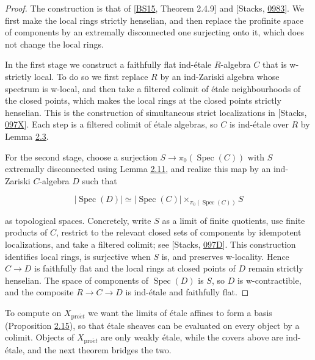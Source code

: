 \documentclass[11pt]{article}
\begin{document}
\begin{proof}[{Proof}]\label{bp38}%
The construction is that of [\hyperref[bp191]{BS15}, Theorem 2.4.9] and [Stacks, \href{https://stacks.math.columbia.edu/tag/0983}{0983}]. We first make the local rings strictly henselian, and then replace the profinite space of components by an extremally disconnected one surjecting onto it, which does not change the local rings.

In the first stage we construct a faithfully flat ind-étale \(R\)-algebra \(C\) that is w-strictly local. To do so we first replace \(R\) by an ind-Zariski algebra whose spectrum is w-local, and then take a filtered colimit of étale neighbourhoods of the closed points, which makes the local rings at the closed points strictly henselian. This is the construction of simultaneous strict localizations in [Stacks, \href{https://stacks.math.columbia.edu/tag/097X}{097X}]. Each step is a filtered colimit of étale algebras, so \(C\) is ind-étale over \(R\) by Lemma \hyperref[bp10]{2.3}.

For the second stage, choose a surjection \(S\to\pi_0(\operatorname{Spec}(C))\) with \(S\) extremally disconnected using Lemma \hyperref[bp31]{2.11}, and realize this map by an ind-Zariski \(C\)-algebra \(D\) such that

\[
|\operatorname{Spec}(D)|
\simeq |\operatorname{Spec}(C)|
\times_{\pi_0(\operatorname{Spec}(C))}S
\]

as topological spaces. Concretely, write \(S\) as a limit of finite quotients, use finite products of \(C\), restrict to the relevant closed sets of components by idempotent localizations, and take a filtered colimit; see [Stacks, \href{https://stacks.math.columbia.edu/tag/097D}{097D}]. This construction identifies local rings, is surjective when \(S\) is, and preserves w-locality. Hence \(C\to D\) is faithfully flat and the local rings at closed points of \(D\) remain strictly henselian. The space of components of \(\operatorname{Spec}(D)\) is \(S\), so \(D\) is w-contractible, and the composite \(R\to C\to D\) is ind-étale and faithfully flat.
\end{proof}

\label{bp39}%
To compute on \(X_{\mathrm{pro}\acute{e}t}\) we want the limits of étale affines to form a basis (Proposition \hyperref[bp44]{2.15}), so that étale sheaves can be evaluated on every object by a colimit. Objects of \(X_{\mathrm{pro}\acute{e}t}\) are only weakly étale, while the covers above are ind-étale, and the next theorem bridges the two.
\end{document}
